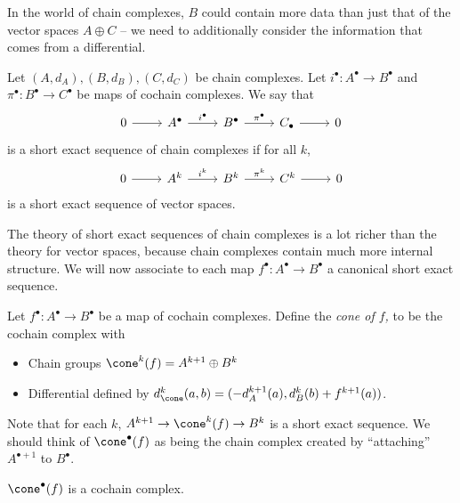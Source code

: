 In the world of chain complexes, $B$ could contain more data than just that of the vector spaces $A\oplus C$ -- we need to additionally consider the information that comes from a differential.
\begin{definition}
Let $(A, d_A), (B, d_B), (C, d_C)$ be chain complexes. Let $i^\bullet: A^\bullet\to B^\bullet$ and $\pi^\bullet: B^\bullet\to C^\bullet$ be maps of cochain complexes. We say that 
\[\begin{tikzcd} 0 \arrow{r} & A^\bullet \arrow{r}{i^\bullet} & B^\bullet \arrow{r}{\pi^\bullet} & C_\bullet \arrow{r} & 0 \end{tikzcd}\] 
is a short exact sequence of chain complexes if for all $k$, 
\[\begin{tikzcd} 0 \arrow{r} & A^k \arrow{r}{i^k} & B^k \arrow{r}{\pi^k} & C^k \arrow{r} & 0 \end{tikzcd}\] 
is a short exact sequence of vector spaces. 
\end{definition}
The theory of short exact sequences of chain complexes is a lot richer than the theory for vector spaces, because chain complexes contain much more internal structure. 
We will now associate to each map $f^\bullet: A^\bullet\to B^\bullet$ a canonical short exact sequence.   
\begin{definition}
Let $f^\bullet:A^\bullet\to B^\bullet$ be a map of cochain complexes. Define the \emph{cone of $f$,} to be the cochain complex with 
\begin{itemize}
\item Chain groups $\cone^{k}(f)=A^{k+1}\oplus B^{k}$
\item Differential defined by $d^k_{\cone}(a, b)= (-d_A^{k+1}(a), d^{k}_B(b)+f^{k+1}(a))$. 
\end{itemize}
\label{def:chaincone}
\end{definition}
Note that for each $k$, $A^{k+1}\to \cone^k(f)\to B^k$ is a short exact sequence.
We should think of $\cone^\bullet(f)$ as being the chain complex created by ``attaching'' $A^{\bullet+1}$ to $B^\bullet$. 
\begin{claim}
$\cone^\bullet(f)$ is a cochain complex. 
\end{claim}

